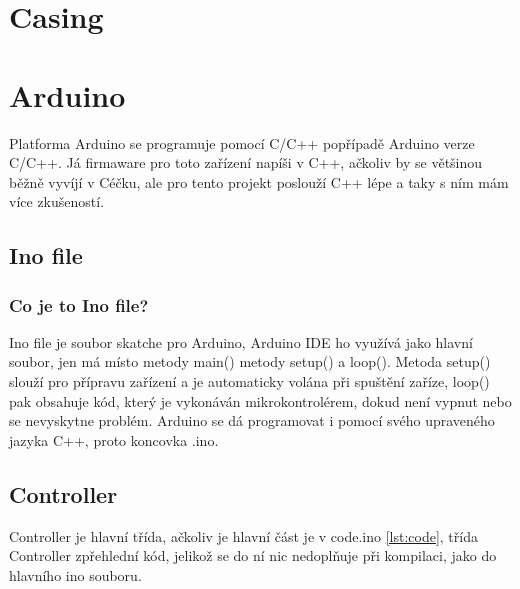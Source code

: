
\section{Casing}

\section{Arduino}
Platforma Arduino se programuje pomocí C/C++ popřípadě Arduino verze C/C++. Já firmaware pro toto zařízení napíši v C++, ačkoliv by se většinou běžně vyvíjí v Céčku, ale pro tento projekt poslouží C++ lépe a taky s ním mám více zkušeností.

\subsection{Ino file}


\subsubsection{Co je to Ino file?}
Ino file je soubor skatche pro Arduino, Arduino IDE ho využívá jako hlavní soubor, jen má místo metody main() metody setup() a loop().  Metoda setup() slouží pro přípravu zařízení a je automaticky volána při spuštění zaříze,  loop() pak obsahuje kód, který je vykonáván mikrokontrolérem, dokud není vypnut nebo se nevyskytne problém. Arduino se dá programovat i pomocí svého upraveného jazyka C++, proto koncovka .ino.

\subsection{Controller}

Controller je hlavní třída, ačkoliv je hlavní část je v code.ino \ref{lst:code}, třída Controller zpřehlední kód, jelikož se do ní nic nedoplňuje při kompilaci, jako do hlavního ino souboru.